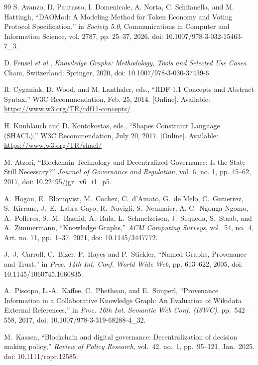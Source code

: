 \documentclass[journal]{IEEEtran}
\begin{document}
\begin{thebibliography}{99}
S. Avanzo, D. Pautasso, I. Domenicale, A. Norta, C. Schifanella, and M. Hattingh,
``DAOMod: A Modeling Method for Token Economy and Voting Protocol Specification,''
in \emph{Society 5.0}, Communications in Computer and Information Science, vol. 2787, pp. 25--37, 2026.
doi: 10.1007/978-3-032-15463-7\_3.

D. Fensel \emph{et al.},
\emph{Knowledge Graphs: Methodology, Tools and Selected Use Cases}.
Cham, Switzerland: Springer, 2020,
doi: 10.1007/978-3-030-37439-6.

R. Cyganiak, D. Wood, and M. Lanthaler, eds.,
``RDF 1.1 Concepts and Abstract Syntax,''
W3C Recommendation, Feb. 25, 2014. [Online]. Available:
\url{https://www.w3.org/TR/rdf11-concepts/}

H. Knublauch and D. Kontokostas, eds.,
``Shapes Constraint Language (SHACL),''
W3C Recommendation, July 20, 2017. [Online]. Available:
\url{https://www.w3.org/TR/shacl/}

M. Atzori,
``Blockchain Technology and Decentralized Governance: Is the State Still Necessary?''
\textit{Journal of Governance and Regulation},
vol. 6, no. 1, pp. 45--62, 2017,
doi: 10.22495/jgr\_v6\_i1\_p5.


A.~Hogan, E.~Blomqvist, M.~Cochez, C.~d'Amato, G.~de Melo,
C.~Gutierrez, S.~Kirrane, J.~E.~Labra Gayo, R.~Navigli,
S.~Neumaier, A.-C.~Ngonga Ngomo, A.~Polleres, S.~M.~Rashid,
A.~Rula, L.~Schmelzeisen, J.~Sequeda, S.~Staab, and A.~Zimmermann,
``Knowledge Graphs,''
\emph{ACM Computing Surveys}, vol.~54, no.~4, Art. no. 71,
pp.~1--37, 2021, doi: 10.1145/3447772.

J.~J.~Carroll, C.~Bizer, P.~Hayes and P.~Stickler,
``Named Graphs, Provenance and Trust,''
in \emph{Proc. 14th Int. Conf. World Wide Web}, pp. 613--622, 2005,
doi: 10.1145/1060745.1060835.

A.~Piscopo, L.-A.~Kaffee, C.~Phethean, and E.~Simperl,
``Provenance Information in a Collaborative Knowledge Graph:
An Evaluation of Wikidata External References,''
in \emph{Proc. 16th Int. Semantic Web Conf. (ISWC)},
pp.~542--558, 2017, doi: 10.1007/978-3-319-68288-4\_32.

M.~Kassen,
``Blockchain and digital governance:
Decentralization of decision making policy,''
\emph{Review of Policy Research},
vol.~42, no.~1, pp.~95--121,
Jan.~2025.
doi: 10.1111/ropr.12585.


\end{thebibliography}
\end{document}
